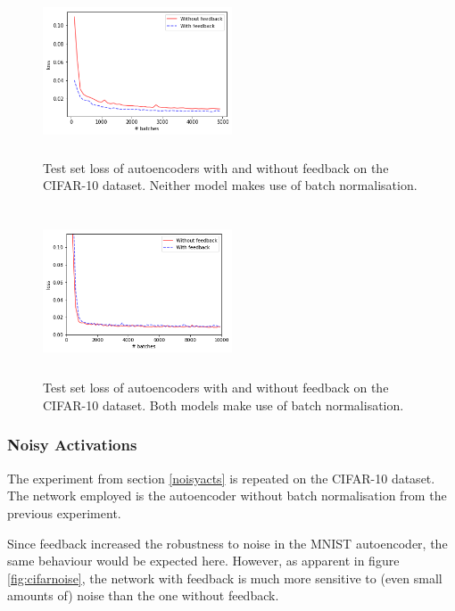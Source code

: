 \documentclass{article}
\begin{document}
\begin{figure}
      \centering
      \includegraphics[width=0.5\textwidth,height=5cm,keepaspectratio]{img/cifar_auto_test_loss.png}
      \caption{Test set loss of autoencoders with and without feedback on the CIFAR-10 dataset. Neither model makes use of batch normalisation. }
      \label{fig:cifarauto}
  \end{figure}
  
  \begin{figure}
      \centering
      \includegraphics[width=0.5\textwidth,height=5cm,keepaspectratio]{img/cifar_auto_batch_test_loss.png}
      \caption{Test set loss of autoencoders with and without feedback on the CIFAR-10 dataset. Both models make use of batch normalisation. }
      \label{fig:cifarautobatch}
  \end{figure}

\subsubsection{Noisy Activations}
\label{noisycifar}
The experiment from section \ref{noisyacts} is repeated on the CIFAR-10 dataset. The network employed is the autoencoder without batch normalisation from the previous experiment. 

Since feedback increased the robustness to noise in the MNIST autoencoder, the same behaviour would be expected here. However, as apparent in figure \ref{fig:cifarnoise}, the network with feedback is much more sensitive to (even small amounts of) noise than the one without feedback. 
\end{document}
